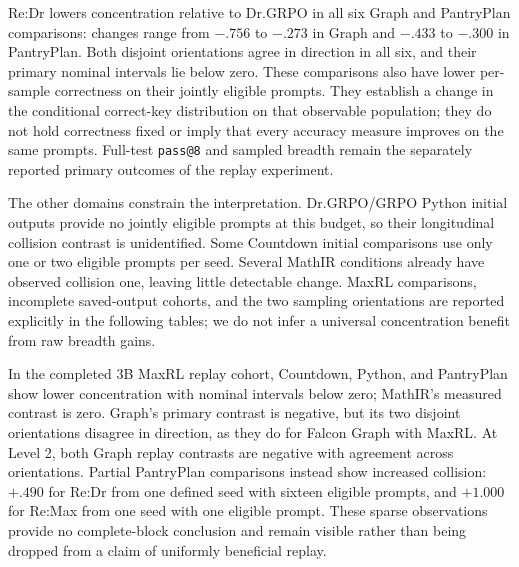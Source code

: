Re:Dr lowers concentration relative to Dr.GRPO in all six Graph and
PantryPlan comparisons: changes range from $-.756$ to $-.273$ in Graph and
$-.433$ to $-.300$ in PantryPlan. Both disjoint orientations agree in direction
in all six, and their primary nominal intervals lie below zero. These
comparisons also have lower per-sample correctness on their jointly eligible
prompts. They establish a change in the conditional correct-key distribution
on that observable population; they do not hold correctness fixed or imply
that every accuracy measure improves on the same prompts. Full-test
\texttt{pass@8} and sampled breadth remain the separately reported primary
outcomes of the replay experiment.

The other domains constrain the interpretation. Dr.GRPO/GRPO Python initial
outputs provide no jointly eligible prompts at this budget, so their
longitudinal collision contrast is unidentified. Some Countdown initial
comparisons use only one or two eligible prompts per seed. Several MathIR
conditions already have observed collision one, leaving little detectable
change. MaxRL comparisons, incomplete saved-output cohorts, and the two
sampling orientations are reported explicitly in the following tables;
we do not infer a universal concentration benefit from raw breadth gains.

In the completed 3B MaxRL replay cohort, Countdown, Python, and PantryPlan
show lower concentration with nominal intervals below zero; MathIR's measured
contrast is zero. Graph's primary contrast is negative, but its two disjoint
orientations disagree in direction, as they do for Falcon Graph with MaxRL.
At Level 2, both Graph replay contrasts are negative with agreement across
orientations. Partial PantryPlan comparisons instead show increased collision:
$+.490$ for Re:Dr from one defined seed with sixteen eligible prompts,
and $+1.000$ for Re:Max from one seed with one eligible prompt. These
sparse observations provide no complete-block conclusion and remain visible
rather than being dropped from a claim of uniformly beneficial replay.


